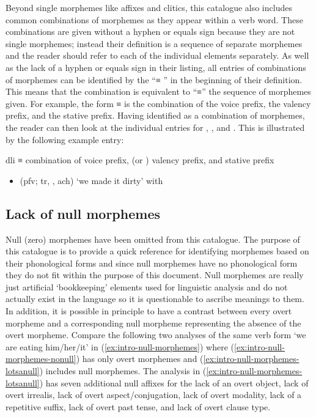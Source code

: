 \documentclass[12pt,letterpaper,oneside,article]{memoir}
\begin{document}
Beyond single morphemes like affixes and clitics, this catalogue also includes common combinations of morphemes as they appear within a verb word.
These combinations are given without a hyphen or equals sign because they are not single morphemes; instead their definition is a sequence of separate morphemes and the reader should refer to each of the individual elements separately.
As well as the lack of a hyphen or equals sign in their listing, all entries of combinations of morphemes can be identified by the “≡ ” in the beginning of their definition.
This means that the combination is equivalent to “≡” the sequence of morphemes given.
For example, the form  ≡  is the combination of the  voice prefix, the  valency prefix, and the  stative prefix.
Having identified  as a combination of morphemes, the reader can then look at the individual entries for , , and .
This is illustrated by the following example entry:

\begin{morphdesc}
\item[dli]
	≡ 
	combination of  voice prefix,
		 (or ) valency prefix,
		and  stative prefix
	\begin{itemize}
	\item	{} (pfv; tr, , ach) ‘we made it dirty’ with 
	\end{itemize}
\end{morphdesc}

\subsection{Lack of null morphemes}\label{sec:intro-null}

Null (zero) morphemes have been omitted from this catalogue.
The purpose of this catalogue is to provide a quick reference for identifying morphemes based on their phonological forms and since null morphemes have no phonological form they do not fit within the purpose of this document.
Null morphemes are really just artificial ‘bookkeeping’ elements used for linguistic analysis and do not actually exist in the language so it is questionable to ascribe meanings to them.
In addition, it is possible in principle to have a contrast between every overt morpheme and a corresponding null morpheme representing the absence of the overt morpheme.
Compare the following two analyses of the same verb form  ‘we are eating him/her/it’ in (\ref{ex:intro-null-morphemes}) where (\ref{ex:intro-null-morphemes-nonull}) has only overt morphemes and (\ref{ex:intro-null-morphemes-lotsanull}) includes null morphemes.
The analysis in (\ref{ex:intro-null-morphemes-lotsanull}) has seven additional null affixes for the lack of an overt object, lack of overt irrealis, lack of overt aspect/conjugation, lack of overt modality, lack of a repetitive suffix, lack of overt past tense, and lack of overt clause type.
\end{document}
